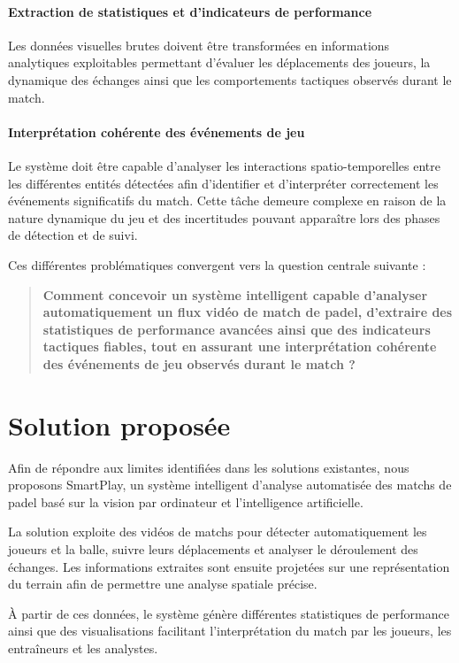 \begin{itemize}
\paragraph{Extraction de statistiques et d’indicateurs de performance}
Les données visuelles brutes doivent être transformées en informations analytiques exploitables permettant d’évaluer les déplacements des joueurs, la dynamique des échanges ainsi que les comportements tactiques observés durant le match.

\paragraph{Interprétation cohérente des événements de jeu}
Le système doit être capable d’analyser les interactions spatio-temporelles entre les différentes entités détectées afin d’identifier et d’interpréter correctement les événements significatifs du match. Cette tâche demeure complexe en raison de la nature dynamique du jeu et des incertitudes pouvant apparaître lors des phases de détection et de suivi.


\vspace{0.5cm}

Ces différentes problématiques convergent vers la question centrale suivante :

\begin{quote}
\textbf{Comment concevoir un système intelligent capable d’analyser automatiquement un flux vidéo de match de padel, d’extraire des statistiques de performance avancées ainsi que des indicateurs tactiques fiables, tout en assurant une interprétation cohérente des événements de jeu observés durant le match ?}
\end{quote}
\section{Solution proposée}

Afin de répondre aux limites identifiées dans les solutions existantes, nous proposons SmartPlay, un système intelligent d’analyse automatisée des matchs de padel basé sur la vision par ordinateur et l’intelligence artificielle.

La solution exploite des vidéos de matchs pour détecter automatiquement les joueurs et la balle, suivre leurs déplacements et analyser le déroulement des échanges. Les informations extraites sont ensuite projetées sur une représentation du terrain afin de permettre une analyse spatiale précise.

À partir de ces données, le système génère différentes statistiques de performance ainsi que des visualisations facilitant l’interprétation du match par les joueurs, les entraîneurs et les analystes.


\end{itemize}
